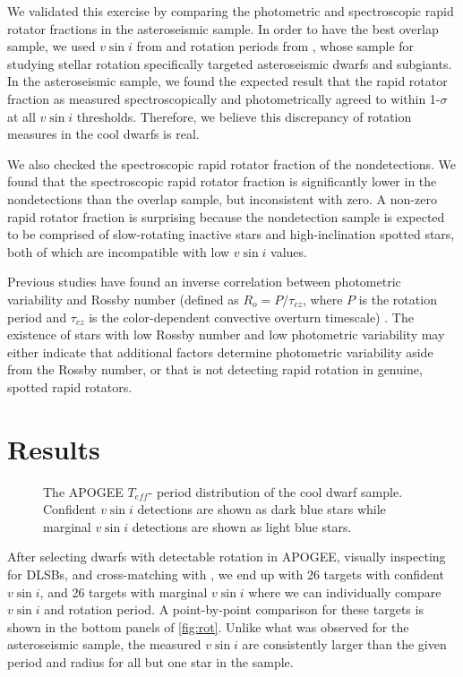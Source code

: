 \documentclass[manuscript]{aastex6}
\newcommand{\vsini}{\ensuremath{v \sin i}}
\newcommand{\Teff}{\ensuremath{T_{eff}}}
\begin{document}
We validated this exercise by comparing the photometric and spectroscopic
rapid rotator fractions in the asteroseismic sample. In order to have the best
overlap sample, we used \vsini{} from \citet{Bruntt12} and rotation periods
from \citet{Garcia14}, whose sample for studying stellar rotation specifically
targeted asteroseismic dwarfs and subgiants. In the asteroseismic
sample, we found the expected result that the rapid rotator
fraction as measured spectroscopically and photometrically agreed to within
1-\(\sigma\) at all \vsini{} thresholds. Therefore, we believe this
discrepancy of rotation measures in the cool dwarfs is real.

We also checked the spectroscopic rapid rotator fraction of the 
\citet{McQuillan14} nondetections. We found that the spectroscopic rapid 
rotator fraction is significantly
lower in the nondetections than the overlap sample, but inconsistent with zero. 
A non-zero rapid rotator fraction is surprising because the nondetection
sample is expected to be comprised of slow-rotating inactive stars and 
high-inclination spotted stars, both of which are incompatible with low 
\vsini{} values. 

Previous studies have found an inverse correlation between 
photometric variability and Rossby number (defined as \(R_o = P / \tau_{cz}\), where \(P\)
    is the rotation period and \(\tau_{cz}\) is the color-dependent 
convective overturn timescale) \citep{Messina01,Hartman09}. The existence of 
stars with low Rossby number and low photometric variability may either 
indicate that additional factors determine photometric variability 
aside from the Rossby number, or that \citet{McQuillan14} is not detecting 
rapid rotation in genuine, spotted rapid rotators.



\section{Results}
\label{sec:results}

\begin{figure}
  \caption{The APOGEE \Teff-\citet{McQuillan14} period distribution of the 
  cool dwarf sample. Confident \vsini{} detections are shown as dark blue
  stars while marginal \vsini{} detections are shown as light blue
  stars.\label{fig:periods}}
\end{figure}

After selecting dwarfs with detectable rotation in APOGEE,
visually inspecting for DLSBs, and cross-matching with \citet{McQuillan14}, we 
end up with 26 targets with confident \vsini{}, and 26 targets with marginal
\vsini{} where we can individually compare \vsini{} and rotation period. A 
point-by-point
comparison for these targets is shown in the bottom panels of
\cref{fig:rot}. Unlike what was observed for the
asteroseismic sample, the measured \vsini{} are consistently larger than the 
given period and radius for all but one star in the sample.
\end{document}
